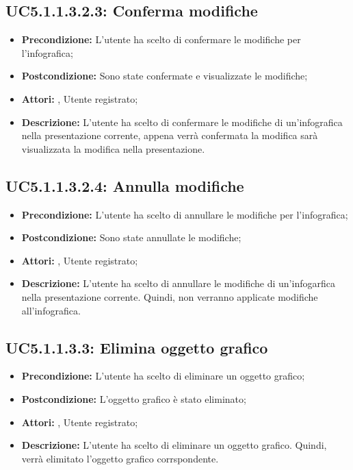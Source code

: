 \subsection{ UC5.1.1.3.2.3: Conferma modifiche}

\begin{itemize}
	\item \textbf{Precondizione:} L'utente ha scelto di confermare le modifiche per l'infografica;
	\item \textbf{Postcondizione:} Sono state confermate e visualizzate le modifiche;
	\item \textbf{Attori:} , Utente registrato;
	\item \textbf{Descrizione:} L'utente ha scelto di confermare le modifiche di un'infografica nella presentazione corrente, appena verrà confermata la modifica sarà visualizzata la modifica nella presentazione.
\end{itemize}
\subsection{ UC5.1.1.3.2.4: Annulla modifiche}

\begin{itemize}
	\item \textbf{Precondizione:} L'utente ha scelto di annullare le modifiche per l'infografica;
	\item \textbf{Postcondizione:} Sono state annullate le modifiche;
	\item \textbf{Attori:} , Utente registrato;
	\item \textbf{Descrizione:} L'utente ha scelto di annullare le modifiche di un'infogarfica nella presentazione corrente. Quindi, non verranno applicate modifiche all'infografica.
\end{itemize}
\subsection{ UC5.1.1.3.3: Elimina oggetto grafico}

\begin{itemize}
	\item \textbf{Precondizione:} L'utente ha scelto di eliminare un oggetto grafico;
	\item \textbf{Postcondizione:} L'oggetto grafico è stato eliminato;
	\item \textbf{Attori:} , Utente registrato;
	\item \textbf{Descrizione:} L'utente ha scelto di eliminare un oggetto grafico. Quindi, verrà elimitato l'oggetto grafico corrspondente.
\end{itemize}
